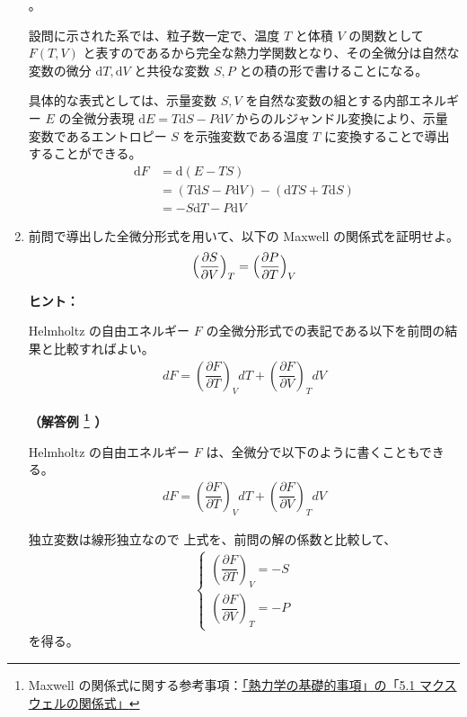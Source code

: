 \documentclass[uplatex,dvipdfmx,a4paper,11pt]{jsarticle}
\newcommand{\diff}{\mathrm d}
\begin{document}
\begin{enumerate}
{}。

設問に示された系では、粒子数一定で、温度 $T$ と体積 $V$ の関数として $F(T,V)$ と表すのであるから完全な熱力学関数となり、その全微分は自然な変数の微分 $\diff T, \diff V$ と共役な変数 $S, P$ との積の形で書けることになる。

具体的な表式としては、示量変数 $S, V$ を自然な変数の組とする内部エネルギー $E$ の全微分表現 $\diff E = T \diff S - P \diff V$ からのルジャンドル変換により、示量変数であるエントロピー $S$ を示強変数である温度 $T$ に変換することで導出することができる。
\begin{align*}
\diff F 
	&= \diff(E-TS) \\
	&= (T \diff S - P \diff V) -(\diff T S + T \diff S) \\
	&=-S \diff T -P \diff V
\end{align*}

\color{black}

\newpage

\item
前問で導出した全微分形式を用いて、以下の Maxwell の関係式を証明せよ。
\begin{equation*}
\Bigl( \frac{\partial S}{\partial V} \Bigr)_T = \Bigl( \frac{\partial P}{\partial T} \Bigr)_V
\end{equation*}


\begin{itembox}[l]{{\bf ヒント：}}

Helmholtz の自由エネルギー $F$ の全微分形式での表記である以下を前問の結果と比較すればよい。
\begin{align*}
dF = \left( \dfrac{\partial F}{\partial T} \right)_V dT + \left( \dfrac{\partial  F}{\partial V} \right)_T dV
\end{align*}

\end{itembox}

{\bf （解答例
\footnote{
Maxwell の関係式に関する参考事項：\href{http://kisokouza.island.ac/documents/Thermo_Dynamics_basics.pdf}{「熱力学の基礎的事項」の「5.1 マクスウェルの関係式」}
}
）}

Helmholtz の自由エネルギー $F$ は、全微分で以下のように書くこともできる。
\begin{align*}
dF = \left( \dfrac{\partial F}{\partial T} \right)_V dT + \left( \dfrac{\partial  F}{\partial V} \right)_T dV
\end{align*}

独立変数は線形独立なので 上式を、前問の解の係数と比較して、
\begin{align*}
\begin{cases}
\left( \dfrac{\partial F}{\partial T} \right)_V = -S \\[10pt]
\left( \dfrac{\partial  F}{\partial V} \right)_T = -P
\end{cases}
\end{align*}
を得る。


\end{enumerate}
\end{document}
